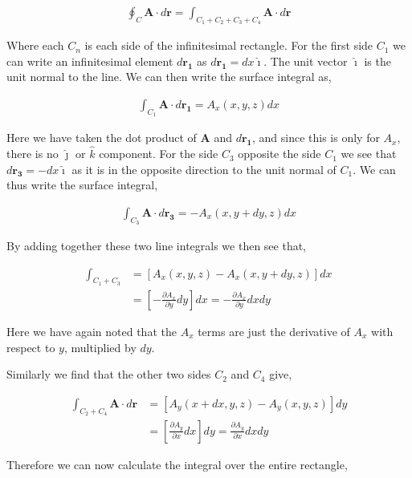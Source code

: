 \documentclass[11pt]{amsart}
\begin{document}
\begin{align*}
  \oint_C \mathbf{A} \cdot d\mathbf{r} = \int_{C_1 + C_2 + C_3 + C_4} \mathbf{A} \cdot d\mathbf{r}
\end{align*}

Where each $C_n$ is each side of the infinitesimal rectangle. For the first side $C_1$ we can write an infinitesimal element $d\mathbf{r_1}$ as $d\mathbf{r_1} = dx \hat{\imath}$. The unit vector $\hat{\imath}$ is the unit normal to the line. We can then write the surface integral as,

\begin{align*}
  \int_{C_1} \mathbf{A} \cdot d\mathbf{r_1} = A_x(x, y, z) dx
\end{align*}

Here we have taken the dot product of $\mathbf{A}$ and $d\mathbf{r_1}$, and since this is only for $A_x$, there is no $\hat{\jmath}$ or $\hat{k}$ component. For the side $C_3$ opposite the side $C_1$ we see that $d\mathbf{r_3} = -dx \hat{\imath}$ as it is in the opposite direction to the unit normal of $C_1$. We can thus write the surface integral,

\begin{align*}
  \int_{C_3} \mathbf{A} \cdot d\mathbf{r_3} = -A_x(x, y + dy, z) dx
\end{align*}

By adding together these two line integrals we then see that,

\begin{align*}
  \int_{C_1 + C_3} &= \left[A_x(x, y, z) - A_x(x, y + dy, z)\right] dx \\
                   &= \left[-\frac{\partial A_x}{\partial y} dy\right] dx = -\frac{\partial A_x}{\partial y} dx dy
\end{align*}

Here we have again noted that the $A_x$ terms are just the derivative of $A_x$ with respect to $y$, multiplied by $dy$. 

Similarly we find that the other two sides $C_2$ and $C_4$ give,

\begin{align*}
  \int_{C_2 + C_4} \mathbf{A} \cdot d\mathbf{r} &= \left[A_y(x + dx, y, z) - A_y(x, y, z)\right] dy \\
                                                &= \left[\frac{\partial A_y}{\partial x} dx\right] dy = \frac{\partial A_y}{\partial x} dx dy
\end{align*}

Therefore we can now calculate the integral over the entire rectangle,
\end{document}
